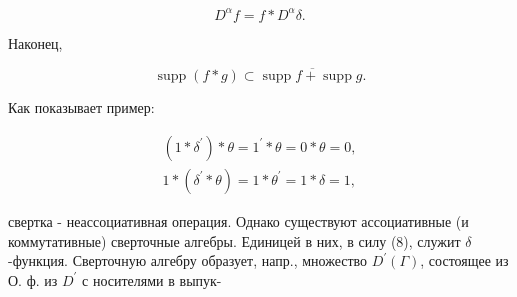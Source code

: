 \documentclass[10pt]{article}
\begin{document}
\[

D^{\alpha} f=f * D^{\alpha} \delta .

\]



Наконец,



\[

\operatorname{supp}(f * g) \subset \overline{\operatorname{supp} f+\operatorname{supp} g .}

\]



Как показывает пример:



\[

\begin{gathered}

\left(1 * \delta^{\prime}\right) * \theta=1^{\prime} * \theta=0 * \theta=0, \\

1 *\left(\delta^{\prime} * \theta\right)=1 * \theta^{\prime}=1 * \delta=1,

\end{gathered}

\]



свертка - неассоциативная операция. Однако существуют ассоциативные (и коммутативные) сверточные алгебры. Единицей в них, в силу (8), служит $\delta$-функция. Сверточную алгебру образует, напр., множество $D^{\prime}(\Gamma)$, состоящее из О. ф. из $D^{\prime}$ с носителями в выпук-
\end{document}
